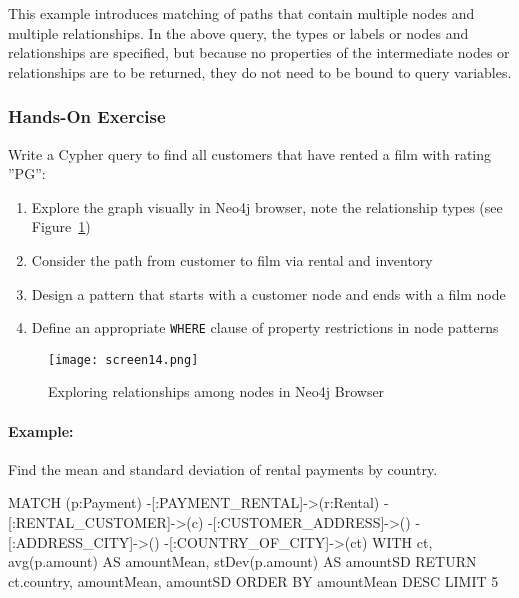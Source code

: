 This example introduces matching of paths that contain multiple nodes and multiple relationships. In the above query, the types or labels or nodes and relationships are specified, but because no properties of the intermediate nodes or relationships are to be returned, they do not need to be bound to query variables.


\begin{tcolorbox}[colback=code]
\subsubsection*{Hands-On Exercise}

Write a Cypher query to find all customers that have rented a film with rating ''PG'':

\begin{enumerate}
  \item Explore the graph visually in Neo4j browser, note the relationship types (see Figure~\ref{fig:explorerelationships})
  \item Consider the path from customer to film via rental and inventory
  \item Design a pattern that starts with a customer node and ends with a film node
  \item Define an appropriate \texttt{WHERE} clause of property restrictions in node patterns
\end{enumerate}
\end{tcolorbox}

\begin{figure}
\texttt{[image: screen14.png]}
\caption{Exploring relationships among nodes in Neo4j Browser}
\label{fig:explorerelationships}
\end{figure}

\paragraph*{Example:} Find the mean and standard deviation of rental payments by country.

\begin{cyphercode}
MATCH (p:Payment) 
        -[:PAYMENT_RENTAL]->(r:Rental) 
        -[:RENTAL_CUSTOMER]->(c) 
        -[:CUSTOMER_ADDRESS]->() 
        -[:ADDRESS_CITY]->()
        -[:COUNTRY_OF_CITY]->(ct)
WITH ct, 
     avg(p.amount) AS amountMean, 
     stDev(p.amount) AS amountSD
RETURN ct.country, amountMean, amountSD
ORDER BY amountMean DESC LIMIT 5
\end{cyphercode}

